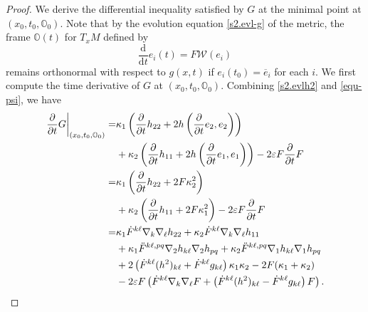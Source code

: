 \documentclass[10pt,a4paper]{amsart}
\begin{document}
\begin{proof}
    We derive the differential inequality satisfied by $G$ at the minimal point at $(x_0,t_0,\mathbb{O}_0)$. Note that by the evolution equation \eqref{s2.evl-g} of the metric, the frame $\mathbb{O}(t)$ for $T_x M$ defined by
    \begin{equation*}
    	\dfrac{\mathrm{d}}{\mathrm{d}t}e_i(t) = F \mathcal{W}(e_i)
    \end{equation*}
    remains orthonormal with respect to $g(x,t)$ if $e_i(t_0)=\overline{e}_i$ for each $i$.  We first compute the 
    time derivative of $G$ at $(x_0,t_0,\mathbb{O}_0)$. Combining \eqref{s2.evlh2} and \eqref{equ-psi}, we have 
    \begin{align}
    	\left.\dfrac{\partial}{\partial t} G \right|_{(x_0,t_0,\mathbb{O}_0)} = & \kappa_1 \left(\frac{\partial}{\partial t}h_{22}+2h\left(\frac{\partial}{\partial t}e_2,e_2\right)\right) \nonumber\\
        &+ \kappa_2 \left(\frac{\partial}{\partial t}h_{11}+2h\left(\frac{\partial}{\partial t}e_1,e_1\right)\right) - 2 \varepsilon F \dfrac{\partial}{\partial t}F \notag\\
    	= & \kappa_1 \left(\frac{\partial}{\partial t}h_{22}+2F\kappa_2^2\right) \nonumber\\
        &+ \kappa_2 \left(\frac{\partial}{\partial t}h_{11}+2F\kappa_1^2\right) - 2 \varepsilon F \dfrac{\partial}{\partial t}F \notag\\
        = &  \kappa_1 \dot{F}^{k\ell} \nabla_k\nabla_{\ell} h_{22} + \kappa_2 \dot{F}^{k\ell}\nabla_k\nabla_{\ell} h_{11} \nonumber\\
        &+ \kappa_1\ddot{F}^{k\ell,pq}\nabla_2 h_{k\ell}\nabla_2 h_{pq} + \kappa_2 \ddot{F}^{k\ell,pq}\nabla_1 h_{k\ell}\nabla_1 h_{pq} \nonumber\\
    	& + 2 \left( \dot{F}^{k\ell}(h^2)_{k\ell} + \dot{F}^{k\ell}g_{k\ell} \right)\kappa_1\kappa_2 - 2 F (\kappa_1+\kappa_2) \nonumber\\
    	& - 2\varepsilon F \left( \dot{F}^{k\ell} \nabla_k \nabla_{\ell} F + \left( \dot{F}^{k\ell}(h^2)_{k\ell} - \dot{F}^{k\ell}g_{k\ell} \right)F  \right).
    	\label{equ-Gt-2}
    \end{align}
    

\end{proof}
\end{document}
